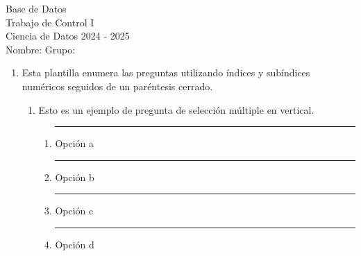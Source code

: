 \documentclass[12pt]{article}
\newcommand{\linetomark}{\rule{0.5cm}{0.4pt}  \hspace{1mm}}
\begin{document}
\begin{center}
    Base de Datos  \\[2mm]
    Trabajo de Control I\\[2mm]
    \small{Ciencia de Datos 2024 - 2025} \\[2mm]
  \normalsize Nombre: \underline{\hspace{3.7in}} \hspace{5mm}  Grupo: \underline{\hspace{1in}}
\end{center}

\vspace{1.2em}


\begin{enumerate}[label=\arabic*)]
    \item Esta plantilla enumera las preguntas utilizando índices y subíndices numéricos seguidos de un paréntesis cerrado.
    \begin{enumerate}[label=1.\arabic*)]
        \item Esto es un ejemplo de pregunta de selección múltiple en vertical.
        \begin{enumerate}[label=\alph*.]
            \item \linetomark Opción a
            
            \item \linetomark Opción b

            \item \linetomark Opción c

            \item \linetomark Opción d
            

\end{enumerate}
\end{enumerate}
\end{enumerate}
\end{document}
